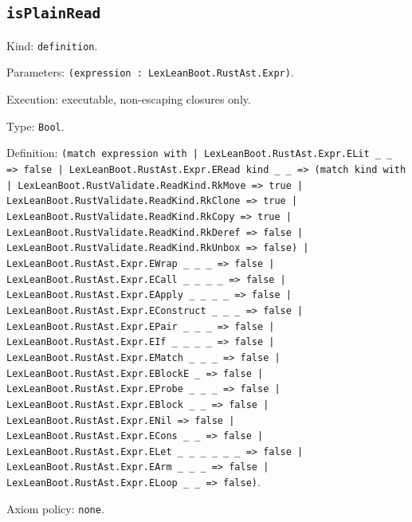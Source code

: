 \documentclass[11pt]{article}
\begin{document}
\subsection*{\texttt{isPlainRead}}
\noindent Kind: \texttt{definition}.\par
\noindent Parameters: \texttt{(expression : LexLeanBoot.RustAst.Expr)}.\par
\noindent Execution: executable, non-escaping closures only.\par
\noindent Type: \texttt{Bool}.\par
\noindent Definition: \texttt{(match expression with | LexLeanBoot.RustAst.Expr.ELit \_ \_ => false | LexLeanBoot.RustAst.Expr.ERead kind \_ \_ => (match kind with | LexLeanBoot.RustValidate.ReadKind.RkMove => true | LexLeanBoot.RustValidate.ReadKind.RkClone => true | LexLeanBoot.RustValidate.ReadKind.RkCopy => true | LexLeanBoot.RustValidate.ReadKind.RkDeref => false | LexLeanBoot.RustValidate.ReadKind.RkUnbox => false) | LexLeanBoot.RustAst.Expr.EWrap \_ \_ \_ => false | LexLeanBoot.RustAst.Expr.ECall \_ \_ \_ \_ => false | LexLeanBoot.RustAst.Expr.EApply \_ \_ \_ \_ => false | LexLeanBoot.RustAst.Expr.EConstruct \_ \_ \_ => false | LexLeanBoot.RustAst.Expr.EPair \_ \_ \_ => false | LexLeanBoot.RustAst.Expr.EIf \_ \_ \_ \_ => false | LexLeanBoot.RustAst.Expr.EMatch \_ \_ \_ => false | LexLeanBoot.RustAst.Expr.EBlockE \_ => false | LexLeanBoot.RustAst.Expr.EProbe \_ \_ \_ => false | LexLeanBoot.RustAst.Expr.EBlock \_ \_ => false | LexLeanBoot.RustAst.Expr.ENil => false | LexLeanBoot.RustAst.Expr.ECons \_ \_ => false | LexLeanBoot.RustAst.Expr.ELet \_ \_ \_ \_ \_ \_ => false | LexLeanBoot.RustAst.Expr.EArm \_ \_ \_ => false | LexLeanBoot.RustAst.Expr.ELoop \_ \_ => false)}.\par
\noindent Axiom policy: \texttt{none}.\par
\end{document}
